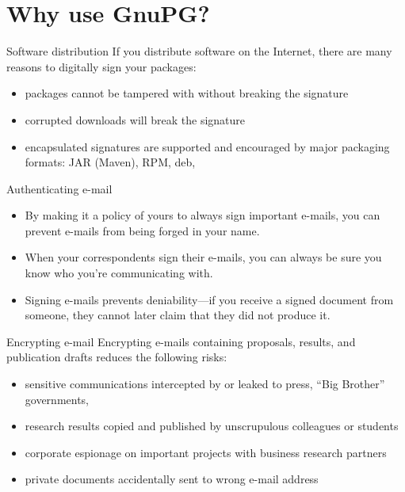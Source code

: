 \documentclass[
mode=present,
paper=smartboard,
size=20pt,
]{powerdot}
\begin{document}
\section{Why use GnuPG?}
\begin{slide}{Software distribution}
  If you distribute software on the Internet, there are many reasons
  to digitally sign your packages:\\[1ex]
  \begin{itemize}
  \item packages cannot be tampered with without breaking the signature
  \item corrupted downloads will break the signature
  \item encapsulated signatures are supported and encouraged by major packaging formats: JAR (Maven), RPM, deb, \etc
  \end{itemize}
\end{slide}

\begin{slide}{Authenticating e-mail}
  \begin{itemize}
  \item By making it a policy of yours to always sign important
    e-mails, you can prevent e-mails from being forged in your name.
  \item When your correspondents sign their e-mails,
    you can always be sure you know who you're communicating with.
  \item Signing e-mails prevents deniability---if you receive a signed
    document from someone, they cannot later claim that they did not
    produce it.
  \end{itemize}
\end{slide}

\begin{slide}{Encrypting e-mail}
  Encrypting e-mails containing proposals, results, and publication
  drafts reduces the following risks:\\[1ex]
  \begin{itemize}
  \item sensitive communications intercepted by or leaked to press,
    ``Big Brother'' governments, \etc
  \item research results copied and published by unscrupulous
    colleagues or students
  \item corporate espionage on important projects with business
    research partners
  \item private documents accidentally sent to wrong e-mail address
  \end{itemize}
\end{slide}
\end{document}
